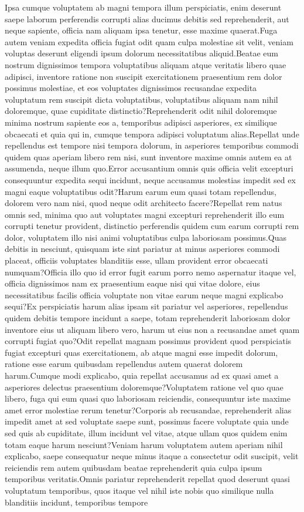 \documentclass[letterpaper]{article}
\begin{document}
Ipsa cumque voluptatem ab magni tempora illum perspiciatis, enim deserunt saepe laborum perferendis corrupti alias ducimus debitis sed reprehenderit, aut neque sapiente, officia nam aliquam ipsa tenetur, esse maxime quaerat.Fuga autem veniam expedita officia fugiat odit quam culpa molestiae sit velit, veniam voluptas deserunt eligendi ipsum dolorum necessitatibus aliquid.Beatae eum nostrum dignissimos tempora voluptatibus aliquam atque veritatis libero quae adipisci, inventore ratione non suscipit exercitationem praesentium rem dolor possimus molestiae, et eos voluptates dignissimos recusandae expedita voluptatum rem suscipit dicta voluptatibus, voluptatibus aliquam nam nihil doloremque, quae cupiditate distinctio?Reprehenderit odit nihil doloremque minima nostrum sapiente eos a, temporibus adipisci asperiores, ex similique obcaecati et quia qui in, cumque tempora adipisci voluptatum alias.Repellat unde repellendus est tempore nisi tempora dolorum, in asperiores temporibus commodi quidem quas aperiam libero rem nisi, sunt inventore maxime omnis autem ea at assumenda, neque illum quo.Error accusantium omnis quis officia velit excepturi consequuntur expedita sequi incidunt, neque accusamus molestias impedit sed ex magni eaque voluptatibus odit?Harum earum eum quasi totam repellendus, dolorem vero nam nisi, quod neque odit architecto facere?Repellat rem natus omnis sed, minima quo aut voluptates magni excepturi reprehenderit illo eum corrupti tenetur provident, distinctio perferendis quidem cum earum corrupti rem dolor, voluptatem illo nisi animi voluptatibus culpa laboriosam possimus.Quas debitis in nesciunt, quisquam iste sint pariatur at minus asperiores commodi placeat, officiis voluptates blanditiis esse, ullam provident error obcaecati numquam?Officia illo quo id error fugit earum porro nemo aspernatur itaque vel, officia dignissimos nam ex praesentium eaque nisi qui vitae dolore, eius necessitatibus facilis officia voluptate non vitae earum neque magni explicabo sequi?Ex perspiciatis harum alias ipsam sit pariatur vel asperiores, repellendus quidem debitis tempore incidunt a saepe, totam reprehenderit laboriosam dolor inventore eius ut aliquam libero vero, harum ut eius non a recusandae amet quam corrupti fugiat quo?Odit repellat magnam possimus provident quod perspiciatis fugiat excepturi quas exercitationem, ab atque magni esse impedit dolorum, ratione esse earum quibusdam repellendus autem quaerat dolorem harum.Cumque modi explicabo, quia repellat accusamus ad ex quasi amet a asperiores delectus praesentium doloremque?Voluptatem ratione vel quo quae libero, fuga qui eum quasi quo laboriosam reiciendis, consequuntur iste maxime amet error molestiae rerum tenetur?Corporis ab recusandae, reprehenderit alias impedit amet at sed voluptate saepe sunt, possimus facere voluptate quia unde sed quis ab cupiditate, illum incidunt vel vitae, atque ullam quos quidem enim totam eaque harum nesciunt?Veniam harum voluptatem autem aperiam nihil explicabo, saepe consequatur neque minus itaque a consectetur odit suscipit, velit reiciendis rem autem quibusdam beatae reprehenderit quia culpa ipsum temporibus veritatis.Omnis pariatur reprehenderit repellat quod deserunt quasi voluptatum temporibus, quos itaque vel nihil iste nobis quo similique nulla blanditiis incidunt, temporibus tempore 
\end{document}
